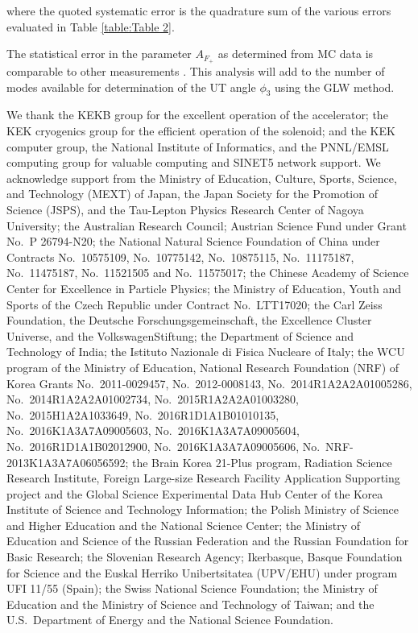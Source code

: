 \documentclass[aps,prl,twocolumn,superscriptaddress,showpacs,preprintnumbers,amsmath,amssymb]{revtex4}
\begin{document}
where the quoted systematic error is the quadrature sum of the various errors evaluated in Table \ref{table:Table 2}. 

The statistical error in the parameter $A_{F_{+}}$ as determined from MC data is comparable to other measurements \cite{BaBar, LHCb}. This analysis will add to the number of modes available for determination of the UT angle $\phi_3$ using the GLW method.



We thank the KEKB group for the excellent operation of the
accelerator; the KEK cryogenics group for the efficient
operation of the solenoid; and the KEK computer group,
the National Institute of Informatics, and the 
PNNL/EMSL computing group for valuable computing
and SINET5 network support.  We acknowledge support from
the Ministry of Education, Culture, Sports, Science, and
Technology (MEXT) of Japan, the Japan Society for the 
Promotion of Science (JSPS), and the Tau-Lepton Physics 
Research Center of Nagoya University; 
the Australian Research Council;
Austrian Science Fund under Grant No.~P 26794-N20;
the National Natural Science Foundation of China under Contracts 
No.~10575109, No.~10775142, No.~10875115, No.~11175187, No.~11475187, 
No.~11521505 and No.~11575017;
the Chinese Academy of Science Center for Excellence in Particle Physics; 
the Ministry of Education, Youth and Sports of the Czech
Republic under Contract No.~LTT17020;
the Carl Zeiss Foundation, the Deutsche Forschungsgemeinschaft, the
Excellence Cluster Universe, and the VolkswagenStiftung;
the Department of Science and Technology of India; 
the Istituto Nazionale di Fisica Nucleare of Italy; 
the WCU program of the Ministry of Education, National Research Foundation (NRF)
of Korea Grants No.~2011-0029457, No.~2012-0008143,
No.~2014R1A2A2A01005286,
No.~2014R1A2A2A01002734, No.~2015R1A2A2A01003280,
No.~2015H1A2A1033649, No.~2016R1D1A1B01010135, No.~2016K1A3A7A09005603, No.~2016K1A3A7A09005604, No.~2016R1D1A1B02012900,
No.~2016K1A3A7A09005606, No.~NRF-2013K1A3A7A06056592;
the Brain Korea 21-Plus program, Radiation Science Research Institute, Foreign Large-size Research Facility Application Supporting project and the Global Science Experimental Data Hub Center of the Korea Institute of Science and Technology Information;
the Polish Ministry of Science and Higher Education and 
the National Science Center;
the Ministry of Education and Science of the Russian Federation and
the Russian Foundation for Basic Research;
the Slovenian Research Agency;
Ikerbasque, Basque Foundation for Science and
the Euskal Herriko Unibertsitatea (UPV/EHU) under program UFI 11/55 (Spain);
the Swiss National Science Foundation; 
the Ministry of Education and the Ministry of Science and Technology of Taiwan;
and the U.S.\ Department of Energy and the National Science Foundation.
\end{document}
